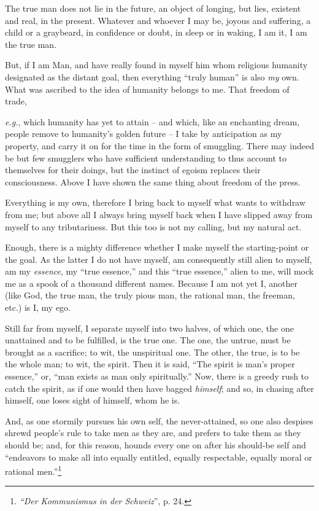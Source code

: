 The true man does not lie in the future, an object of longing, but lies, 
existent and real, in the present. Whatever and whoever I may be, joyous and 
suffering, a child or a graybeard, in confidence or doubt, in sleep or in 
waking, I am it, I am the true man.

But, if I am Man, and have really found in myself him whom religious humanity 
designated as the distant goal, then everything ``truly human'' is also 
\textit{my} own. What was ascribed to the idea of humanity belongs to me. That 
freedom of trade,

\textit{e.g.}, which humanity has yet to attain -- and which, like an 
enchanting dream, people remove to humanity's golden future -- I take by 
anticipation as my property, and carry it on for the time in the form of 
smuggling. There may indeed be but few smugglers who have sufficient 
understanding to thus account to themselves for their doings, but the instinct 
of egoism replaces their consciousness. Above I have shown the same thing 
about freedom of the press.

Everything is my own, therefore I bring back to myself what wants to withdraw 
from me; but above all I always bring myself back when I have slipped away 
from myself to any tributariness. But this too is not my calling, but my 
natural act.

Enough, there is a mighty difference whether I make myself the starting-point 
or the goal. As the latter I do not have myself, am consequently still alien 
to myself, am my \textit{essence}, my ``true essence,'' and this ``true 
essence,'' alien to me, will mock me as a spook of a thousand different 
names. Because I am not yet I, another (like God, the true man, the truly 
pious man, the rational man, the freeman, etc.) is I, my ego.

Still far from myself, I separate myself into two halves, of which one, the 
one unattained and to be fulfilled, is the true one. The one, the untrue, must 
be brought as a sacrifice; to wit, the unspiritual one. The other, the true, 
is to be the whole man; to wit, the spirit. Then it is said, ``The spirit is 
man's proper essence,'' or, ``man exists as man only spiritually.'' Now, 
there is a greedy rush to catch the spirit, as if one would then have bagged 
\textit{himself}; and so, in chasing after himself, one loses sight of 
himself, whom he is.

And, as one stormily pursues his own self, the never-attained, so one also 
despises shrewd people's rule to take men as they are, and prefers to take 
them as they should be; and, for this reason, hounds every one on after his 
should-be self and ``endeavors to make all into equally entitled, equally 
respectable, equally moral or rational men.''\footnote{\textit{``Der 
Kommunismus in der Schweiz}'', p. 24.}

